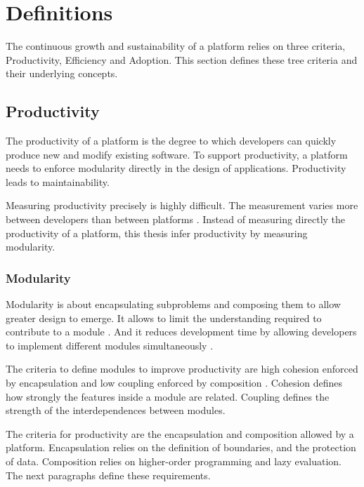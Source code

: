 \section{Definitions} \label{chapter3:definitions}

The continuous growth and sustainability of a platform relies on three criteria, Productivity, Efficiency and Adoption.
This section defines these tree criteria and their underlying concepts.

\subsection{Productivity} \label{chapter3:definitions:productivity}

The productivity of a platform is the degree to which developers can quickly produce new and modify existing software.
To support productivity, a platform needs to enforce modularity directly in the design of applications.
Productivity leads to maintainability.

Measuring productivity precisely is highly difficult.
The measurement varies more between developers than between platforms \cite{Sackman1968}.
Instead of measuring directly the productivity of a platform, this thesis infer productivity by measuring modularity.

\subsubsection{Modularity} \label{chapter3:definitions:productivity:modularity}

Modularity is about encapsulating subproblems and composing them to allow greater design to emerge.
It allows to limit the understanding required to contribute to a module \cite{Stevens1974}.
And it reduces development time by allowing developers to implement different modules simultaneously \cite{Wong2009,Cataldo2006}.

The criteria to define modules to improve productivity are high cohesion enforced by encapsulation and low coupling enforced by composition \cite{Stevens1974}.
Cohesion defines how strongly the features inside a module are related.
Coupling defines the strength of the interdependences between modules.

\separator

The criteria for productivity are the encapsulation and composition allowed by a platform.
Encapsulation relies on the definition of boundaries, and the protection of data.
Composition relies on higher-order programming and lazy evaluation.
The next paragraphs define these requirements.

